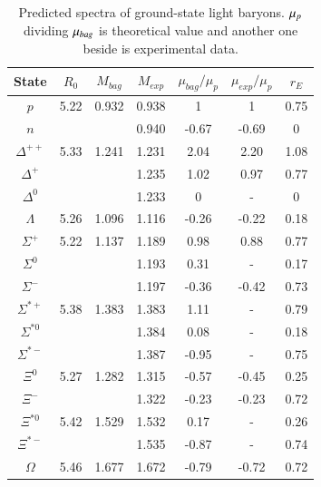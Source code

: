 \documentclass[12pt,onecolumn,floatfix,nofootinbib]{revtex4}
\begin{document}
\renewcommand{\tabcolsep}{0.25cm} \renewcommand{\arraystretch}{1.3}
\begin{table}[!htb]
\caption{Predicted spectra of ground-state light baryons. $\protect\mu_{p}$
dividing $\protect\mu_{bag}$ is theoretical value and another one beside is
experimental data.}
\label{tab:lightbaryon}%
\begin{tabular}{ccccccc}
\hline\hline
\textrm{State} & $R_{0}$ & $M_{bag}$ & $M_{exp}$ & $\mu_{bag}/\mu_{p}$ & $%
\mu_{exp}/\mu_{p}$ & $r_{E}$ \\ \hline
$p$ & 5.22 & 0.932 & 0.938 & 1 & 1 & 0.75 \\
$n$ &  &  & 0.940 & -0.67 & -0.69 & 0 \\
$\Delta^{++}$ & 5.33 & 1.241 & 1.231 & 2.04 & 2.20 & 1.08 \\
$\Delta^{+}$ &  &  & 1.235 & 1.02 & 0.97 & 0.77 \\
$\Delta^{0}$ &  &  & 1.233 & 0 & - & 0 \\
$\Lambda$ & 5.26 & 1.096 & 1.116 & -0.26 & -0.22 & 0.18 \\
$\Sigma^{+}$ & 5.22 & 1.137 & 1.189 & 0.98 & 0.88 & 0.77 \\
$\Sigma^{0}$ &  &  & 1.193 & 0.31 & - & 0.17 \\
$\Sigma^{-}$ &  &  & 1.197 & -0.36 & -0.42 & 0.73 \\
$\Sigma^{\ast +}$ & 5.38 & 1.383 & 1.383 & 1.11 & - & 0.79 \\
$\Sigma^{\ast 0}$ &  &  & 1.384 & 0.08 & - & 0.18 \\
$\Sigma^{\ast -}$ &  &  & 1.387 & -0.95 & - & 0.75 \\
$\Xi^{0}$ & 5.27 & 1.282 & 1.315 & -0.57 & -0.45 & 0.25 \\
$\Xi^{-}$ &  &  & 1.322 & -0.23 & -0.23 & 0.72 \\
$\Xi^{\ast 0}$ & 5.42 & 1.529 & 1.532 & 0.17 & - & 0.26 \\
$\Xi^{\ast -}$ &  &  & 1.535 & -0.87 & - & 0.74 \\
$\Omega$ & 5.46 & 1.677 & 1.672 & -0.79 & -0.72 & 0.72 \\ \hline\hline
\end{tabular}%
\end{table}
\end{document}
